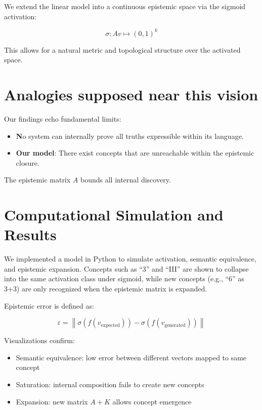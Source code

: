 \documentclass[11pt]{article}
\begin{document}
    We extend the linear model into a continuous epistemic space via the sigmoid activation:

    \[
        \sigma: Av \mapsto (0,1)^k
    \]

    This allows for a natural metric and topological structure over the activated space.

    \section{Analogies supposed near this vision}

    Our findings echo fundamental limits:

    \begin{itemize}[noitemsep]
        \item \textbf No system can internally prove all truths expressible within its language.
        \item \textbf{Our model}: There exist concepts that are unreachable within the epistemic closure.
    \end{itemize}

    The epistemic matrix $A$ bounds all internal discovery.

    \section{Computational Simulation and Results}

    We implemented a model in Python to simulate activation, semantic equivalence, and epistemic expansion. Concepts such as ``3'' and ``III'' are shown to collapse into the same activation class under sigmoid, while new concepts (e.g., ``6'' as 3+3) are only recognized when the epistemic matrix is expanded.

    Epistemic error is defined as:

    \[
        \varepsilon = \left\| \sigma(f(v_{\text{expected}})) - \sigma(f(v_{\text{generated}})) \right\|
    \]

    Visualizations confirm:

    \begin{itemize}[noitemsep]
        \item Semantic equivalence: low error between different vectors mapped to same concept
        \item Saturation: internal composition fails to create new concepts
        \item Expansion: new matrix $A + K$ allows concept emergence
    \end{itemize}
\end{document}
